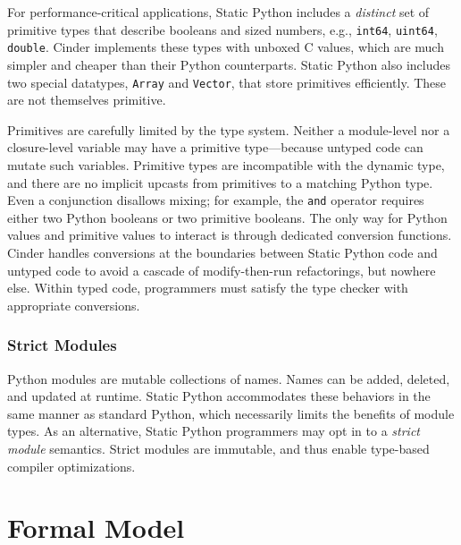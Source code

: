 \documentclass[english,cleveref,submission]{programming}
\newcommand{\SP}{Static Python}
\newcommand{\code}[1]{\texttt{#1}}
\begin{document}


For performance-critical applications, \SP{} includes a \emph{distinct} set of primitive types
that describe booleans and sized numbers, e.g., \code{int64}, \code{uint64}, \code{double}.
Cinder implements these types with unboxed C values, which are much simpler and cheaper
than their Python counterparts.
\SP{} also includes two special datatypes, \code{Array} and \code{Vector}, that store primitives efficiently.
These are not themselves primitive.

Primitives are carefully limited by the type system.
Neither a module-level nor a closure-level variable may have a primitive
type---because untyped code can mutate such variables.
Primitive types are incompatible with the dynamic type,
and there are no implicit upcasts from primitives
to a matching Python type.
Even a conjunction disallows mixing; for example, the \code{and} operator
requires either two Python booleans or two primitive booleans.
The only way for Python values and primitive values to interact
is through dedicated conversion functions.
Cinder handles conversions at the boundaries between \SP{} code
and untyped code to avoid a cascade of modify-then-run refactorings, but nowhere else.
Within typed code, programmers must satisfy the type checker with
appropriate conversions.




\subsubsection{Strict Modules}
\label{s:strict-mod}

Python modules are mutable collections of names.
Names can be added, deleted, and updated at runtime.
\SP{} accommodates these behaviors in the same manner as standard Python, which
necessarily limits the benefits of module types.
As an alternative, \SP{} programmers may opt in to a \emph{strict module} semantics.
Strict modules are immutable, and thus enable type-based compiler optimizations.


\section{Formal Model}
\label{s:model}
\end{document}
